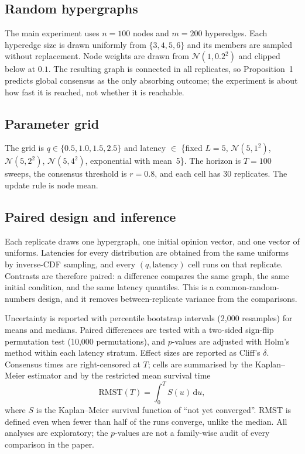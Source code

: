 \documentclass[conference]{IEEEtran}
\newcommand{\N}{\mathcal{N}}
\newcommand{\dd}{\mathrm{d}}
\begin{document}
\subsection{Random hypergraphs}
The main experiment uses $n=100$ nodes and $m=200$ hyperedges. Each hyperedge size is drawn uniformly from $\{3,4,5,6\}$ and its members are sampled without replacement. Node weights are drawn from $\N(1,0.2^{2})$ and clipped below at $0.1$. The resulting graph is connected in all replicates, so Proposition~1 predicts global consensus as the only absorbing outcome; the experiment is about how fast it is reached, not whether it is reachable.

\subsection{Parameter grid}
The grid is $q\in\{0.5,1.0,1.5,2.5\}$ and latency $\in$ \{fixed $L=5$, $\N(5,1^{2})$, $\N(5,2^{2})$, $\N(5,4^{2})$, exponential with mean~5\}. The horizon is $T=100$ sweeps, the consensus threshold is $r=0.8$, and each cell has 30 replicates. The update rule is node mean.

\subsection{Paired design and inference}
Each replicate draws one hypergraph, one initial opinion vector, and one vector of uniforms. Latencies for every distribution are obtained from the same uniforms by inverse-CDF sampling, and every $(q,\text{latency})$ cell runs on that replicate. Contrasts are therefore paired: a difference compares the same graph, the same initial condition, and the same latency quantiles. This is a common-random-numbers design, and it removes between-replicate variance from the comparisons.

Uncertainty is reported with percentile bootstrap intervals (2,000 resamples) for means and medians. Paired differences are tested with a two-sided sign-flip permutation test (10,000 permutations), and $p$-values are adjusted with Holm's method within each latency stratum. Effect sizes are reported as Cliff's $\delta$. Consensus times are right-censored at $T$; cells are summarised by the Kaplan--Meier estimator and by the restricted mean survival time
\begin{equation}
\mathrm{RMST}(T)=\int_0^{T}S(u)\,\dd u,
\label{eq:rmst}
\end{equation}
where $S$ is the Kaplan--Meier survival function of ``not yet converged''. RMST is defined even when fewer than half of the runs converge, unlike the median. All analyses are exploratory; the $p$-values are not a family-wise audit of every comparison in the paper.
\end{document}
